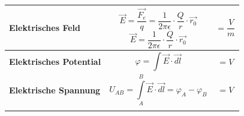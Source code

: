 \begin{tabular}{| C{4cm} | P{6cm} | P{7cm} |}
\hline
\textbf{Elektrisches Feld} \newline \newline {} &\begin{equation*}
\vec{E} = \dfrac{\vec{F_e}}{q} = \dfrac{1}{2\pi\epsilon}\cdot\dfrac{Q}{r}\cdot\vec{r_0}
\end{equation*} \begin{equation*}
\vec{E} = \dfrac{1}{2\pi\epsilon}\cdot\dfrac{Q}{r}\cdot\vec{r_0}
\end{equation*}    & \begin{equation*}
[E] = \dfrac{V}{m}
\end{equation*} 									\\
\hline
\textbf{Elektrisches Potential}  &	\begin{equation*}
\varphi = \int\vec{E}\cdot\vec{dl}	
\end{equation*}			 & \begin{equation*}
[\varphi] = V
\end{equation*} \\
\hline
\textbf{Elektrische Spannung}   &	\begin{equation*}
U_{AB} = \int\limits_{A}^{B}\vec{E}\cdot\vec{dl} = \varphi_A - \varphi_B
\end{equation*}    &  \begin{equation*}
[U] = V 
\end{equation*}               \\     
\lasthline
\end{tabular}
\newpage
